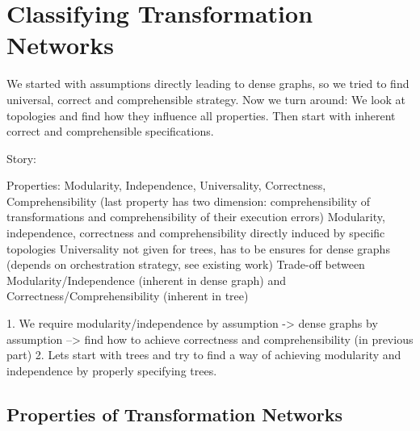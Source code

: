 \chapter{Classifying Transformation Networks
}
\label{chap:properties}

We started with assumptions directly leading to dense graphs, so we tried to find universal, correct and comprehensible strategy.
Now we turn around: We look at topologies and find how they influence all properties. Then start with inherent correct and comprehensible specifications.

Story:

Properties: Modularity, Independence, Universality, Correctness, Comprehensibility (last property has two dimension: comprehensibility of transformations and comprehensibility of their execution errors)
Modularity, independence, correctness and comprehensibility directly induced by specific topologies
Universality not given for trees, has to be ensures for dense graphs (depends on orchestration strategy, see existing work)
Trade-off between Modularity/Independence (inherent in dense graph) and Correctness/Comprehensibility (inherent in tree)

1. We require modularity/independence by assumption -> dense graphs by assumption --> find how to achieve correctness and comprehensibility (in previous part)
2. Lets start with trees and try to find a way of achieving modularity and independence by properly specifying trees.


\section{Properties of Transformation Networks}

